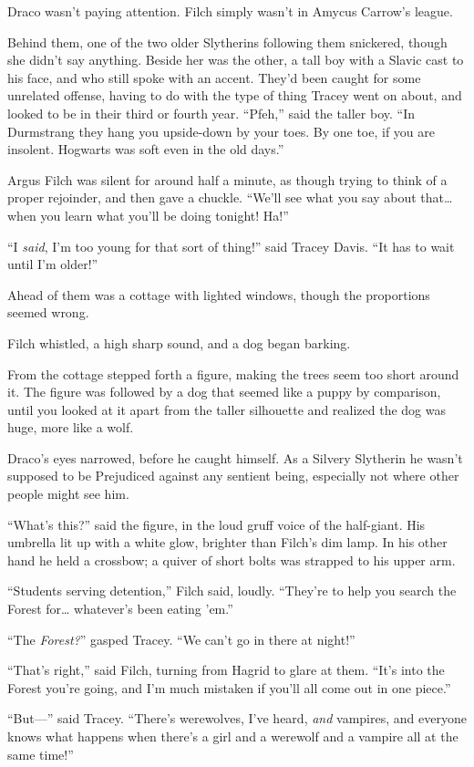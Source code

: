 Draco wasn’t paying attention. Filch simply wasn’t in Amycus Carrow’s league.

Behind them, one of the two older Slytherins following them snickered, though she didn’t say anything. Beside her was the other, a tall boy with a Slavic cast to his face, and who still spoke with an accent. They’d been caught for some unrelated offense, having to do with the type of thing Tracey went on about, and looked to be in their third or fourth year. “Pfeh,” said the taller boy. “In Durmstrang they hang you upside-down by your toes. By one toe, if you are insolent. Hogwarts was soft even in the old days.”

Argus Filch was silent for around half a minute, as though trying to think of a proper rejoinder, and then gave a chuckle. “We’ll see what you say about that…when you learn what you’ll be doing tonight! Ha!”

“I \emph{said}, I’m too young for that sort of thing!” said Tracey Davis. “It has to wait until I’m older!”

Ahead of them was a cottage with lighted windows, though the proportions seemed wrong.

Filch whistled, a high sharp sound, and a dog began barking.

From the cottage stepped forth a figure, making the trees seem too short around it. The figure was followed by a dog that seemed like a puppy by comparison, until you looked at it apart from the taller silhouette and realized the dog was huge, more like a wolf.

Draco’s eyes narrowed, before he caught himself. As a Silvery Slytherin he wasn’t supposed to be Prejudiced against any sentient being, especially not where other people might see him.

“What’s this?” said the figure, in the loud gruff voice of the half-giant. His umbrella lit up with a white glow, brighter than Filch’s dim lamp. In his other hand he held a crossbow; a quiver of short bolts was strapped to his upper arm.

“Students serving detention,” Filch said, loudly. “They’re to help you search the Forest for… whatever’s been eating ’em.”

“The \emph{Forest?}” gasped Tracey. “We can’t go in there at night!”

“That’s right,” said Filch, turning from Hagrid to glare at them. “It’s into the Forest you’re going, and I’m much mistaken if you’ll all come out in one piece.”

“But—” said Tracey. “There’s werewolves, I’ve heard, \emph{and} vampires, and everyone knows what happens when there’s a girl and a werewolf and a vampire all at the same time!”

